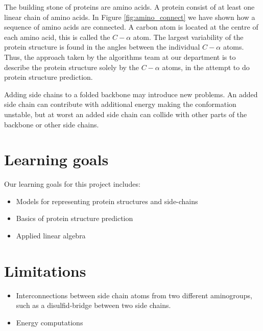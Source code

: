 \documentclass[10pt,a4paper,final,oneside,openany,article]{memoir}
\begin{document}
The building stone of proteins are amino acids. A protein consist of
at least one linear chain of amino acids. In Figure
\ref{fig:amino_connect} we have shown how a sequence of amino acids
are connected. A carbon atom is located at the centre of each amino
acid, this is called the $C-\alpha$ atom. The largest variability of
the protein structure is found in the angles between the individual
$C-\alpha$ atoms. Thus, the approach taken by the algorithms team at
our department is to describe the protein structure solely by the
$C-\alpha$ atoms, in the attempt to do protein structure prediction. 





Adding side chains to a folded backbone may introduce new problems. An
added side chain can contribute with additional energy making the
conformation unstable, but at worst an added side chain can collide
with other parts of the backbone or other side chains.




\section{Learning goals}
Our learning goals for this project includes:
\begin{itemize}
\item Models for representing protein structures and side-chains
\item Basics of protein structure prediction
\item Applied linear algebra
\end{itemize}


\section{Limitations}
\begin{itemize}
\item Interconnections between side chain atoms from two different
  aminogroups, such as a disulfid-bridge between two side chains.
\item Energy computations
\end{itemize}





\end{document}
